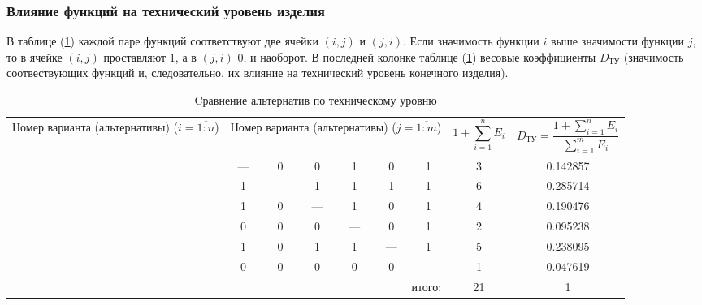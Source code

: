 \subsubsection{Влияние функций на технический уровень изделия}
В таблице (\ref{tbl_technical_lvl_comparison}) каждой паре функций
соответствуют две ячейки $(i, j)$ и $(j, i)$.
Если значимость функции $i$ выше значимости функции
$j$, то в ячейке $(i, j)$ проставляют $1$, а в $(j, i)$ $0$, и наоборот.
В последней колонке таблице (\ref{tbl_technical_lvl_comparison}) весовые
коэффициенты $D_{\text{ТУ}}$ (значимость соотвествующих функций и, следовательно,
их влияние на технический уровень конечного изделия).
\begin{table}[ht!]
    \centering
    \begin{tabular}{|c|c|c|c|c|c|c|c|c|}
        \hline
        \multirow{2}{2.4cm}{
            \centering
            Номер варианта (альтернативы) ($i = \overline{1:n}$)
        } &
        \multicolumn{6}{c|}{
            \parbox[t]{2.4cm}{
                \centering
                Номер варианта (альтернативы) ($j = \overline{1:m}$)
            }
        } &
        \multirow{2}{1.7cm}[0pt]{
            \centering
            $$1 + \sum_{i=1}^n E_i$$
        } &
        \multirow{2}{3.2cm}{
            \centering
            $$ D_\text{ТУ} = \frac{1 + \sum_{i=1}^n E_i}{\sum_{i=1}^m E_i}$$
        } \\
        &
        \centering{1} &
        \centering{2} &
        \centering{3} &
        \centering{4} &
        \centering{5} &
        \centering{6} & & \\
        \hline \hline
        \centering{1} &---& 0 & 0 & 1 & 0 & 1 & 3 & 0.142857 \\ \hline
        \centering{2} & 1 &---& 1 & 1 & 1 & 1 & 6 & 0.285714 \\ \hline
        \centering{3} & 1 & 0 &---& 1 & 0 & 1 & 4 & 0.190476 \\ \hline
        \centering{4} & 0 & 0 & 0 &---& 0 & 1 & 2 & 0.095238 \\ \hline
        \centering{5} & 1 & 0 & 1 & 1 &---& 1 & 5 & 0.238095 \\ \hline
        \centering{6} & 0 & 0 & 0 & 0 & 0 &---& 1 & 0.047619 \\ \hline
        \hline
        \multicolumn{7}{|r|}{итого:} & 21 & 1 \\
        \hline
    \end{tabular}
    \caption{Cравнение альтернатив по техническому уровню}
    \label{tbl_technical_lvl_comparison}
\end{table}

